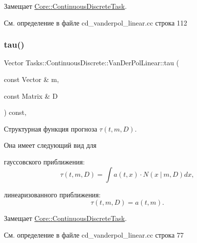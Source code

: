 Замещает \hyperlink{class_core_1_1_continuous_discrete_task_a25e88b71eb477d99bad66a66c982af6f}{Core\+::\+Continuous\+Discrete\+Task}.



См. определение в файле cd\+\_\+vanderpol\+\_\+linear.\+cc строка 112

\hypertarget{class_tasks_1_1_continuous_discrete_1_1_van_der_pol_linear_a5b9245d9f403e615a971f2e8009926e6}{}\label{class_tasks_1_1_continuous_discrete_1_1_van_der_pol_linear_a5b9245d9f403e615a971f2e8009926e6} 
\subsubsection{\texorpdfstring{tau()}{tau()}}
{\footnotesize\ttfamily Vector Tasks\+::\+Continuous\+Discrete\+::\+Van\+Der\+Pol\+Linear\+::tau (\begin{DoxyParamCaption}\item[{const Vector \&}]{m,  }\item[{const Matrix \&}]{D }\end{DoxyParamCaption}) const\hspace{0.3cm}{\ttfamily [override]}, {\ttfamily [virtual]}}



Структурная функция прогноза $\tau(t, m, D)$. 

Она имеет следующий вид для


\begin{DoxyItemize}
\item гауссовского приближения\+: \[\tau(t, m, D) = \int a(t,x)\cdot N(x\ |\ m, D)dx,\]
\item линеаризованного приближения\+: \[\tau(t, m, D) = a(t, m).\] 
\end{DoxyItemize}

Замещает \hyperlink{class_core_1_1_continuous_discrete_task_a491a9dc4463031a6f5f2eeda24d8ba9c}{Core\+::\+Continuous\+Discrete\+Task}.



См. определение в файле cd\+\_\+vanderpol\+\_\+linear.\+cc строка 77

\hypertarget{class_tasks_1_1_continuous_discrete_1_1_van_der_pol_linear_a6d2f1c4c12551eda7eb97322335960ef}{}\label{class_tasks_1_1_continuous_discrete_1_1_van_der_pol_linear_a6d2f1c4c12551eda7eb97322335960ef} 
